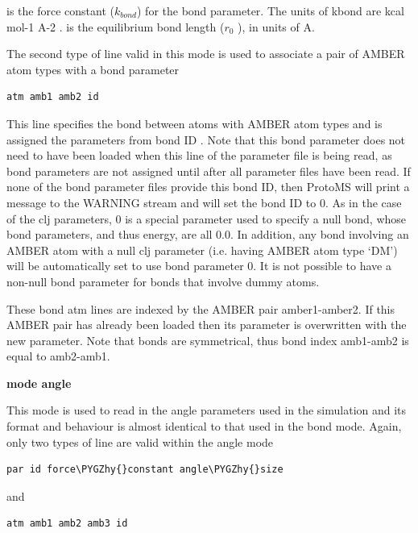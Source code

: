 \documentclass[letterpaper,10pt,english]{sphinxmanual}
\def\PYGZhy{\char`\-}
\begin{document}
 is the force constant (\(k_{bond}\)) for the bond parameter. The units of kbond are kcal mol-1 A-2 .  is the equilibrium bond length (\(r_0\) ), in units of A.

The second type of line valid in this mode is used to associate a pair of AMBER atom types with a bond parameter

\begin{Verbatim}[commandchars=\\\{\}]
atm amb1 amb2 id
\end{Verbatim}

This line specifies the bond between atoms with AMBER atom types  and  is assigned the parameters from bond ID . Note that this bond parameter does not need to have been loaded when this line of the parameter file is being read, as bond parameters are not assigned until after all parameter files have been read. If none of the bond parameter files provide this bond ID, then ProtoMS will print a message to the WARNING stream and will set the bond ID to 0. As in the case of the clj parameters, 0 is a special parameter used to specify a null bond, whose bond parameters, and thus energy, are all 0.0. In addition, any bond involving an AMBER atom with a null clj parameter (i.e. having AMBER atom type ‘DM’) will be automatically set to use bond parameter 0. It is not possible to have a non-null bond parameter for bonds that involve dummy atoms.

These bond atm lines are indexed by the AMBER pair amber1-amber2. If this AMBER pair has already been loaded then its parameter is overwritten with the new parameter. Note that bonds are symmetrical, thus bond index amb1-amb2 is equal to amb2-amb1.

\textbf{mode angle}

This mode is used to read in the angle parameters used in the simulation and its format and behaviour is almost identical to that used in the bond mode. Again, only two types of line are valid within the angle mode

\begin{Verbatim}[commandchars=\\\{\}]
par id force\PYGZhy{}constant angle\PYGZhy{}size
\end{Verbatim}

and

\begin{Verbatim}[commandchars=\\\{\}]
atm amb1 amb2 amb3 id
\end{Verbatim}
\end{document}
